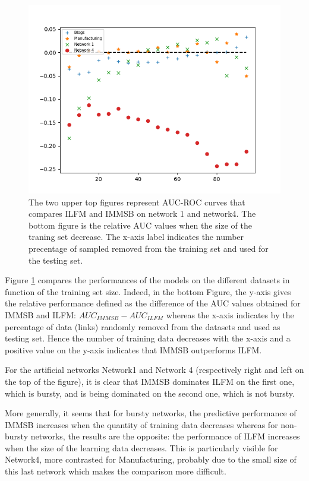 \begin{figure}[h]
\begin{minipage}{0.4\textwidth}
            \includegraphics[width=\textwidth]{img/corpus/testset_max_20_roc_evolution.png}
        \end{minipage}
        \caption{The two upper top figures represent AUC-ROC curves that compares ILFM and IMMSB on network 1 and network4. The bottom figure is the relative AUC values when the size of the traning set decrease. The x-axis label indicates the number precentage of sampled removed from the training set and used for the testing set. } 
	\label{fig:auc}
\end{figure}


Figure \ref{fig:auc} compares the performances of the models on the different datasets in function of  the training set size. Indeed, in the bottom Figure, the y-axis gives the relative performance defined as the difference of the AUC values obtained for IMMSB and ILFM: $AUC_{IMMSB} - AUC_{ILFM}$ whereas the x-axis indicates by the percentage of data (links) randomly removed from the datasets and  used as  testing set. Hence the number of training data decreases with the x-axis and a positive value on the y-axis indicates that IMMSB outperforms ILFM. 

For the artificial networks Network1 and Network 4 (respectively right and left on the top of the figure), it is clear that IMMSB dominates ILFM on the first one, which is bursty, and is being dominated on the second one, which is not bursty.

More generally, it seems that for bursty networks, the predictive performance of IMMSB increases when the quantity of training data decreases whereas for non-bursty networks, the results are the opposite: the performance of ILFM increases when the size of the learning data decreases. This is particularly visible for Network4, more contrasted for Manufacturing,  probably due to the small size of this last network which makes the comparison more difficult.



